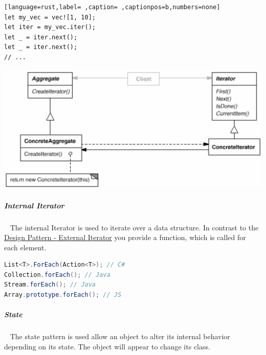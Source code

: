 \documentclass[11pt,twoside,landscape]{article}
\begin{document}
\begin{multicols}{3}
\begin{lstlisting}[language=rust,label= ,caption= ,captionpos=b,numbers=none]
let my_vec = vec![1, 10];
let iter = my_vec.iter();
let _ = iter.next();
let _ = iter.next();
// ...
\end{lstlisting}


{
\begin{center}
\includegraphics[width=.9\linewidth]{img/iterator.png}
\end{center}
\label{fig:iterator-class-diagram}
}
\subparagraph{Internal Iterator} \
\label{sec:orgd6b1c35}
The internal Iterator is used to iterate over a data structure.
In contrast to the \href{../../../roam/20220413201100-design_pattern_iterator.org}{Design Pattern - External Iterator} you provide a function, which is called for each element.

\begin{lstlisting}[language=csharp,label=lst:internal-iterator-examples,caption={Internal Iterator Examples},captionpos=b,numbers=none]
List<T>.ForEach(Action<T>); // C#
Collection.forEach(); // Java
Stream.forEach(); // Java
Array.prototype.forEach(); // JS
\end{lstlisting}
\subparagraph{State} \
\label{sec:orgc387691}
The state pattern is used allow an object to alter its internal behavior depending on its state.
The object will appear to change its class.


\end{multicols}
\end{document}
